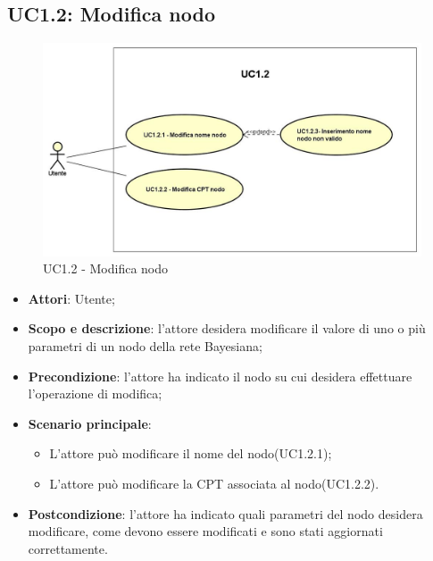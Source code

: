\subsection{UC1.2: Modifica nodo} 
\hypertarget{UC1.2}{} 
\begin{figure} [H]
	\centering
	\includegraphics[scale=0.45]{Img/UC1-2} 
	\caption{UC1.2 - Modifica nodo} \label{} 
\end{figure} 
\begin{itemize} 
	\item{\textbf{Attori}: Utente;} 
	\item{\textbf{Scopo e descrizione}: l'attore desidera modificare il valore di uno o più parametri di un nodo della rete Bayesiana;} 
	\item{\textbf{Precondizione}: l'attore ha indicato il nodo su cui desidera effettuare l'operazione di modifica;} 
	\item{\textbf{Scenario principale}: } 
	\begin{itemize} 
		\item{L'attore può modificare il nome del nodo(UC1.2.1);} 
		\item{L'attore può modificare la CPT associata al nodo(UC1.2.2).} 		
	\end{itemize} 
	\item{\textbf{Postcondizione}: l'attore ha indicato quali parametri del nodo desidera modificare, come devono essere modificati e sono stati aggiornati correttamente.} 
\end{itemize} 

